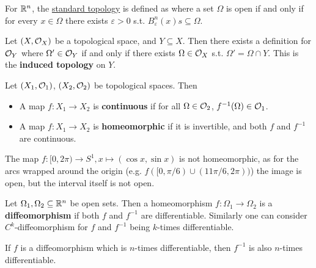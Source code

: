 \documentclass{article}
\begin{document}
\begin{remark}
    For $\mathbb{R}^n$, the \underline{standard topology} is defined as where a set $\Omega$ is open if and only if for every $x \in \Omega$ there exists $\varepsilon > 0$ s.t. $B_{\varepsilon}^n (x)s \subseteq \Omega$. 
\end{remark}

\begin{definition}
    Let $(X, \mathcal{O}_X)$ be a topological space, and $Y \subseteq X$. Then there exists a definition for $\mathcal{O}_Y$ where $\Omega' \in \mathcal{O}_Y$ if and only if there exists $\Omega \in \mathcal{O}_X$ s.t. $\Omega' = \Omega \cap Y$. This is the \textbf{induced topology} on $Y$.
\end{definition}

\begin{definition}
    Let $(X_1, \mathcal{O}_1)$, $(X_2, \mathcal{O}_2)$ be topological spaces. Then
    \begin{itemize}
        \item A map $f: X_1 \to X_2$ is \textbf{continuous} if for all $\Omega \in \mathcal{O}_2$, $f^{-1}(\Omega) \in \mathcal{O}_1$. 
        \item A map $f: X_1 \to X_2$ is \textbf{homeomorphic} if it is invertible, and both $f$ and $f^{-1}$ are continuous. 
    \end{itemize}
\end{definition}

\begin{example}
    The map $f: [0, 2\pi) \to S^1, x \mapsto (\cos x, \sin x)$ is not homeomorphic, as for the arcs wrapped around the origin (e.g. $f([0, \pi/6) \cup (11\pi/6, 2\pi))$) the image is open, but the interval itself is not open.
\end{example}

\begin{definition}[Diffeomorphism]
    Let $\Omega_1, \Omega_2 \subseteq \mathbb{R}^n$ be open sets. Then a homeomorphism $f: \Omega_1 \to \Omega_2$ is a \textbf{diffeomorphism} if both $f$ and $f^{-1}$ are differentiable. Similarly one can consider $C^k$-diffeomorphism for $f$ and $f^{-1}$ being $k$-times differentiable.
\end{definition}

\begin{proposition}
    If $f$ is a diffeomorphism which is $n$-times differentiable, then $f^{-1}$ is also $n$-times differentiable.
\end{proposition}
\end{document}
